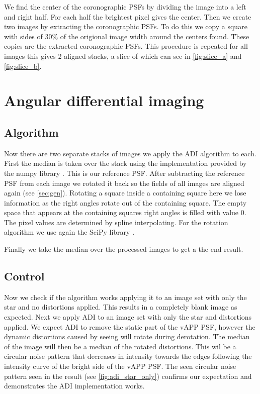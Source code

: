 We find the center of the coronographic \acp{PSF} by dividing the image into a left and right half. For each half the brightest pixel gives the center. Then we create two images by extracting the coronographic \acp{PSF}. To do this we copy a square with sides of $30\%$ of the origional image width around the centers found. These copies are the extracted coronographic \acp{PSF}. This procedure is repeated for all images this gives 2 aligned stacks, a slice of which can see in \autoref{fig:slice_a} and \autoref{fig:slice_b}.

\section{Angular differential imaging}
\subsection{Algorithm}
Now there are two separate stacks of images we apply the \ac{ADI} algorithm \cite{Marois_2006} to each. First the median is taken over the stack using the implementation provided by the numpy library \cite{numpy}. This is our reference \ac{PSF}. After subtracting the reference \ac{PSF} from each image we rotated it back so the fields of all images are aligned again (see \autoref{sec:gen}). Rotating a square inside a containing square here we lose information as the right angles rotate out of the containing square. The empty space that appears at the containing squares right angles is filled with value $0$. The pixel values are determined by spline interpolating. For the rotation algorithm we use again the SciPy library \cite{scipy}.

Finally we take the median over the processed images to get a the end result.

\subsection{Control} %
Now we check if the algorithm works applying it to an image set with only the star and no distortions applied. This results in a completely blank image as expected. Next we apply \ac{ADI} to an image set with only the star and distortions applied. We expect \ac{ADI} to remove the static part of the \ac{vAPP} \ac{PSF}, however the dynamic distortions caused by seeing will rotate during derotation. The median of the image will then be a median of the rotated distortions. This wil be a circular noise pattern that decreases in intensity towards the edges following the intensity curve of the bright side of the \ac{vAPP} \ac{PSF}. The seen circular noise pattern seen in the result (see \autoref{fig:adi_star_only}) confirms our expectation and demonstrates the \ac{ADI} implementation works.


